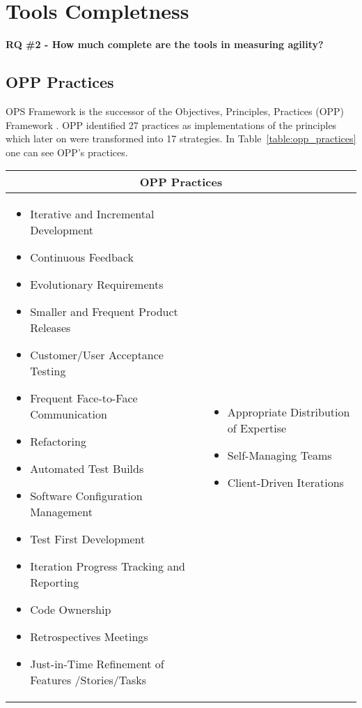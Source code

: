 \chapter{Tools Completness}

\textbf{RQ \#2 - How much complete are the tools in measuring agility?}

\section{OPP Practices}
OPS Framework is the successor of the Objectives, Principles, Practices (OPP) Framework \cite{opp}. OPP identified 27 practices as implementations of the principles which later on were transformed into 17 strategies. In Table~\ref{table:opp_practices} one can see OPP's practices.

\begin{tabular}{| p{7.5cm}  p{7cm} |}
	\hline
	\multicolumn{2}{|c|}{\textbf{OPP Practices}}  \\ \hline
     	\begin{itemize}
     		\item Iterative and Incremental Development 
     		\item Continuous Feedback 
     		\item Evolutionary Requirements 
     		\item Smaller and Frequent Product Releases 
     		\item Customer/User Acceptance Testing 
     		\item Frequent Face-to-Face Communication 
     		\item Refactoring 
     		\item Automated Test Builds 
     		\item Software Configuration Management 
     		\item Test First Development 
     		\item Iteration Progress Tracking and Reporting 
     		\item Code Ownership 
     		\item Retrospectives Meetings 
     		\item Just-in-Time Refinement of Features /Stories/Tasks 
     		\end{itemize} 
     	& \begin{itemize}
     		\item Appropriate Distribution of Expertise 
     		\item Self-Managing Teams 
     		\item Client-Driven Iterations 

\end{itemize}
\end{tabular}
